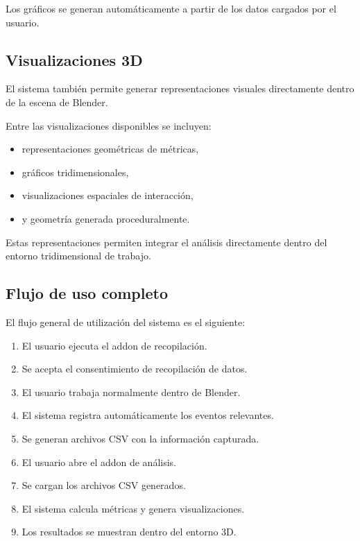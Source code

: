 Los gráficos se generan automáticamente a partir de los datos cargados por el usuario.

\subsection{Visualizaciones 3D}

El sistema también permite generar representaciones visuales directamente dentro de la escena de Blender.

Entre las visualizaciones disponibles se incluyen:

\begin{itemize}
    \item representaciones geométricas de métricas,
    \item gráficos tridimensionales,
    \item visualizaciones espaciales de interacción,
    \item y geometría generada proceduralmente.
\end{itemize}

Estas representaciones permiten integrar el análisis directamente dentro del entorno tridimensional de trabajo.

\subsection{Flujo de uso completo}

El flujo general de utilización del sistema es el siguiente:

\begin{enumerate}
    \item El usuario ejecuta el addon de recopilación.
    \item Se acepta el consentimiento de recopilación de datos.
    \item El usuario trabaja normalmente dentro de Blender.
    \item El sistema registra automáticamente los eventos relevantes.
    \item Se generan archivos CSV con la información capturada.
    \item El usuario abre el addon de análisis.
    \item Se cargan los archivos CSV generados.
    \item El sistema calcula métricas y genera visualizaciones.
    \item Los resultados se muestran dentro del entorno 3D.
\end{enumerate}

